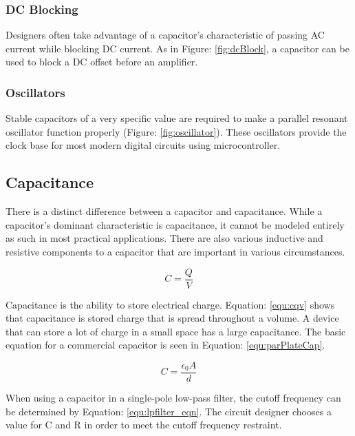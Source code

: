 \subsubsection{DC Blocking}

Designers often take advantage of a capacitor's characteristic of passing AC current while blocking DC current. As in Figure: \ref{fig:dcBlock}, a capacitor can be used to block a DC offset before an amplifier.

\subsubsection{Oscillators}


Stable capacitors of a very specific value are required to make a parallel resonant oscillator function properly (Figure: \ref{fig:oscillator}). These oscillators provide the clock base for most modern digital circuits using microcontroller.

\subsection{Capacitance}

There is a distinct difference between a capacitor and capacitance. While a capacitor's dominant characteristic is capacitance, it cannot be modeled entirely as such in most practical applications. There are also various inductive and resistive components to a capacitor that are important in various circumstances.

\begin{equation}
\label{equ:cqv}
C=\frac{Q}{V}
\end{equation}

Capacitance is the ability to store electrical charge. Equation: \eqref{equ:cqv} shows that capacitance is stored charge that is spread throughout a volume. A device that can store a lot of charge in a small space has a large capacitance. The basic equation for a commercial capacitor is seen in Equation: \eqref{equ:parPlateCap}.

\begin{equation}
\label{equ:parPlateCap}
C = \frac{\epsilon _0 A}{d}
\end{equation}

When using a capacitor in a single-pole low-pass filter, the cutoff frequency can be determined by Equation: \eqref{equ:lpfilter_eqn}. The circuit designer chooses a value for C and R in order to meet the cutoff frequency restraint.

